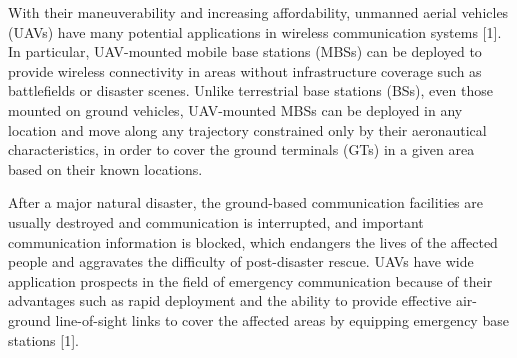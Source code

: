 \documentclass[journal]{IEEEtran}
\begin{document}

With their maneuverability and increasing affordability, unmanned aerial vehicles (UAVs) have many potential applications in wireless communication systems [1]. In particular, UAV-mounted mobile base stations (MBSs) can be deployed to provide wireless connectivity in areas without infrastructure coverage such as battlefields or disaster scenes. Unlike terrestrial base stations (BSs), even those mounted on ground vehicles, UAV-mounted MBSs can be deployed in any location and move along any trajectory constrained only by their aeronautical characteristics, in order to cover the ground terminals (GTs) in a given area based on their known locations.

After a major natural disaster, the ground-based communication facilities are usually destroyed and communication is interrupted, and important communication information is blocked, which endangers the lives of the affected people and aggravates the difficulty of post-disaster rescue. UAVs have wide application prospects in the field of emergency communication because of their advantages such as rapid deployment and the ability to provide effective air-ground line-of-sight links to cover the affected areas by equipping emergency base stations [1].
\end{document}
